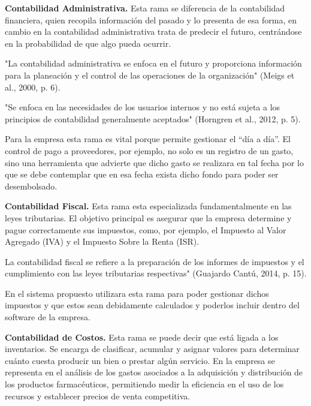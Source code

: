 \textbf{Contabilidad Administrativa.} Esta rama se diferencia de la contabilidad financiera, quien recopila información del pasado y lo presenta de esa forma, en cambio en la contabilidad administrativa trata de predecir el futuro, centrándose en la probabilidad de que algo pueda ocurrir.

"La contabilidad administrativa se enfoca en el futuro y proporciona información para la planeación y el control de las operaciones de la organización" (Meigs et al., 2000, p. 6).

"Se enfoca en las necesidades de los usuarios internos y no está sujeta a los principios de contabilidad generalmente aceptados" (Horngren et al., 2012, p. 5).

Para la empresa esta rama es vital porque permite gestionar el ``día a día''. El control de pago a proveedores, por ejemplo, no solo es un registro de un gasto, sino una herramienta que advierte que dicho gasto se realizara en tal fecha por lo que se debe contemplar que en esa fecha exista dicho fondo para poder ser desembolsado.

\textbf{Contabilidad Fiscal.} Esta rama esta especializada fundamentalmente en las leyes tributarias. El objetivo principal es asegurar que la empresa determine y pague correctamente sus impuestos, como, por ejemplo, el Impuesto al Valor Agregado (IVA) y el Impuesto Sobre la Renta (ISR).

La contabilidad fiscal se refiere a la preparación de los informes de impuestos y el cumplimiento con las leyes tributarias respectivas" (Guajardo Cantú, 2014, p. 15).

En el sistema propuesto utilizara esta rama para poder gestionar dichos impuestos y que estos sean debidamente calculados y poderlos incluir dentro del software de la empresa.

\textbf{Contabilidad de Costos.} Esta rama se puede decir que está ligada a los inventarios. Se encarga de clasificar, acumular y asignar valores para determinar cuánto cuesta producir un bien o prestar algún servicio. En la empresa se representa en el análisis de los gastos asociados a la adquisición y distribución de los productos farmacéuticos, permitiendo medir la eficiencia en el uso de los recursos y establecer precios de venta competitiva.

